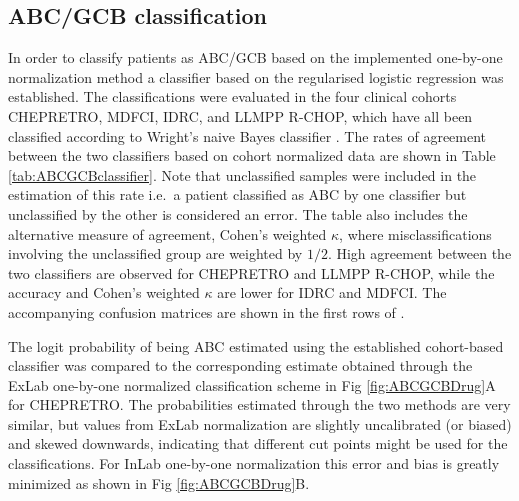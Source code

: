 \documentclass[10pt,letterpaper]{article}
\begin{document}
\subsection*{ABC/GCB classification}
In order to classify patients as ABC/GCB based on the implemented one-by-one normalization method a classifier based on the regularised logistic regression was established.
The classifications were evaluated in the four clinical cohorts CHEPRETRO, MDFCI, IDRC, and LLMPP R-CHOP, which have all been classified according to Wright's naive Bayes classifier \cite{DybkaerBoegsted2015,Wright2003,Lenz2008a}.
The rates of agreement between the two classifiers based on cohort normalized data are shown in Table \ref{tab:ABCGCBclassifier}. Note that unclassified samples were included in the estimation of this rate i.e.\ a patient classified as ABC by one classifier but unclassified by the other is considered an error.
The table also includes the alternative measure of agreement, Cohen's weighted $\kappa$, where misclassifications involving the unclassified group are weighted by $1/2$. High agreement between the two classifiers are observed for CHEPRETRO and LLMPP R-CHOP, while the accuracy and Cohen's weighted $\kappa$ are lower for IDRC and MDFCI.
The accompanying confusion matrices are shown in the first rows of .

The logit probability of being ABC estimated using the established cohort-based classifier was compared to the corresponding estimate obtained through the ExLab one-by-one normalized classification scheme in Fig \ref{fig:ABCGCBDrug}A for CHEPRETRO.
The probabilities estimated through the two methods are very similar, but
values from ExLab normalization are slightly uncalibrated (or biased) and skewed downwards, indicating that different cut points might be used for the classifications.
For InLab one-by-one normalization this error and bias is greatly minimized as shown in Fig \ref{fig:ABCGCBDrug}B.
\end{document}
